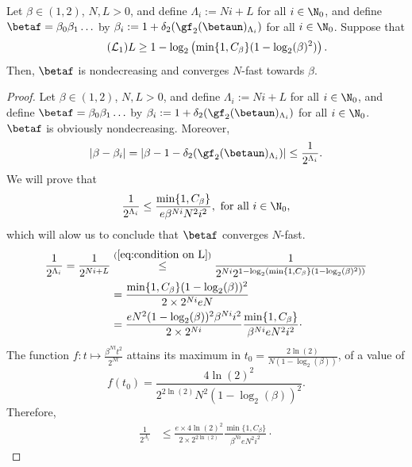 \begin{lemma}\label{lem:condition on L for beta C N converging}
	Let $\beta \in (1,2)$, $N,L > 0$, and define $\Lambda_i := Ni + L$ for all $i \in \N_0$, and define $\betaf = \beta_0\beta_1\ldots$ by $\beta_i := 1 + \delta_2(\gf_2(\betaun)_{\Lambda_i})$ for all $i \in \N_0$. Suppose that 
	\begin{equation}\label{eq:condition on L}
		\tag{\text{$\mathcal L_1$}}
		L \geq 1 -\log_2\left(\min\{1,C_\beta\} (1-\log_2(\beta)^2)\right).
	\end{equation}
	Then, $\betaf$ is nondecreasing and converges $N$-fast towards $\beta$.
\end{lemma}
\begin{proof}
	Let $\beta \in (1,2)$, $N,L > 0$, and define $\Lambda_i := Ni + L$ for all $i \in \N_0$, and define $\betaf = \beta_0\beta_1\ldots$ by $\beta_i := 1 + \delta_2(\gf_2(\betaun)_{\Lambda_i})$ for all $i \in \N_0$. $\betaf$ is obviously nondecreasing. Moreover,
	\begin{equation}
		|\beta - \beta_i| = |\beta - 1 - \delta_2(\gf_2(\betaun)_{\Lambda_{i}})| \leq \frac{1}{2^{\Lambda_{i}}}.
	\end{equation}
	We will prove that
	\begin{equation} \label{eq:condition lambda i for C N fast}
		\frac{1}{2^{\Lambda_{i}}} \leq \frac{\min\{1,C_\beta\}}{e\beta^{Ni}N^2i^2}, \ \text{for all} \ i \in \N_0,
	\end{equation}
	which will alow us to conclude that $\betaf$ converges $N$-fast. 
	\begin{align}
		\frac{1}{2^{\Lambda_{i}}} = \frac{1}{2^{Ni+L}} &\overset{(\ref{eq:condition on L})}{\leq} \frac{1}{2^{Ni} 2^{1 - \log_2(\min\{1,C_\beta\}(1-\log_2(\beta)^2))}}\\ 
		&= \frac{\min\{1,C_\beta\} (1-\log_2(\beta))^2}{2\times2^{Ni}eN}\\
		&= \frac{eN^2(1-\log_2(\beta))^2\beta^{Ni}i^2}{2\times 2^{Ni}}\frac{\min\{1,C_\beta\}}{\beta^{Ni}eN^2i^2}\cdot
	\end{align}
	The function $f : t \mapsto \frac{\beta^{Nt}t^2}{2^{Nt}}$ attains its maximum in $t_0 = \frac{2\ln(2)}{N(1-\log_2(\beta))}$, of a value of
	\begin{equation}
		f(t_0) = \frac{4\ln(2)^2}{2^{2\ln(2)} N^2 (1-\log_2(\beta))^2}.
	\end{equation}
	Therefore,
	\begin{align}
			\frac{1}{2^{\Lambda_{i}}} &\leq \frac{e \times 4\ln(2)^2}{2 \times 2^{2\ln(2)}}\frac{\min\{1,C_\beta\}}{\beta^{Ni}eN^2i^2}\cdot

\end{align}
\end{proof}
